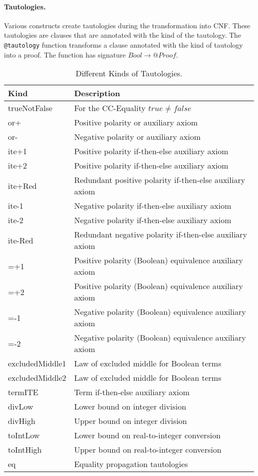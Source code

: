 \documentclass[a4paper]{article}
\begin{document}
\paragraph{Tautologies.}  Various constructs create tautologies during the
transformation into CNF.  These tautologies are clauses that are annotated
with the kind of the tautology.  The \verb+@tautology+ function transforms a
clause annotated with the kind of tautology into a proof.  The function has
signature $Bool\rightarrow @Proof$.
\begin{table}[htbp]
  \begin{tabular}{l|l}
    Kind & Description\\\hline
    trueNotFalse & For the CC-Equality $true\neq false$\\
    or+ & Positive polarity or auxiliary axiom\\
    or- & Negative polarity or auxiliary axiom\\
    ite+1 & Positive polarity if-then-else auxiliary axiom\\
    ite+2 & Positive polarity if-then-else auxiliary axiom\\
    ite+Red & Redundant positive polarity if-then-else auxiliary axiom\\
    ite-1 & Negative polarity if-then-else auxiliary axiom\\
    ite-2 & Negative polarity if-then-else auxiliary axiom\\
    ite-Red & Redundant negative polarity if-then-else auxiliary axiom\\
    =+1 & Positive polarity (Boolean) equivalence auxiliary axiom\\
    =+2 & Positive polarity (Boolean) equivalence auxiliary axiom\\
    =-1 & Negative polarity (Boolean) equivalence auxiliary axiom\\
    =-2 & Negative polarity (Boolean) equivalence auxiliary axiom\\
    excludedMiddle1 & Law of excluded middle for Boolean terms\\
    excludedMiddle2 & Law of excluded middle for Boolean terms\\
    termITE & Term if-then-else auxiliary axiom\\
    divLow & Lower bound on integer division\\
    divHigh & Upper bound on integer division\\
    toIntLow & Lower bound on real-to-integer conversion\\
    toIntHigh & Upper bound on real-to-integer conversion\\
    eq & Equality propagation tautologies
  \end{tabular}
  \caption{\label{tab:tautkinds}Different Kinds of Tautologies.}
\end{table}
\end{document}

